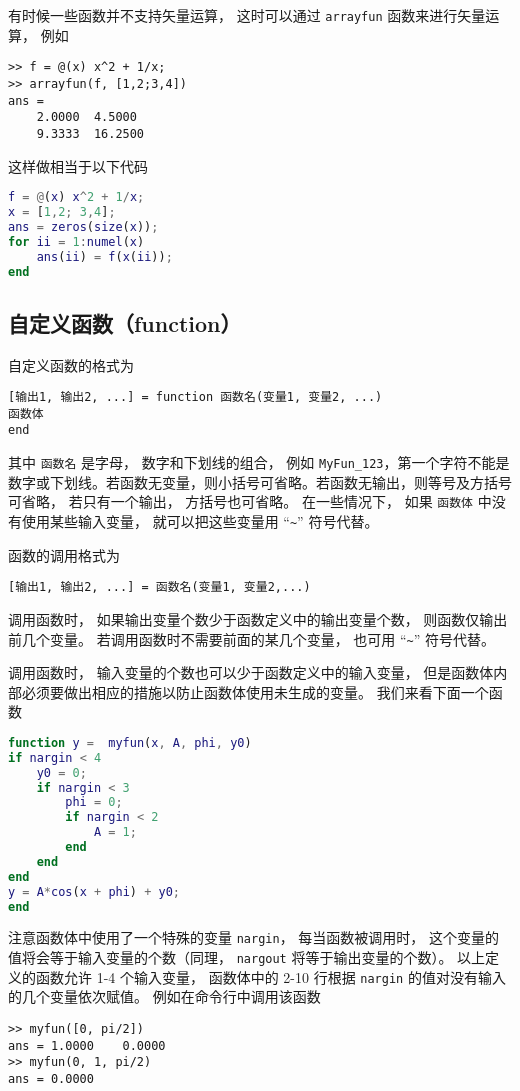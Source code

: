 有时候一些函数并不支持矢量运算， 这时可以通过 \verb|arrayfun| 函数来进行矢量运算， 例如
\begin{lstlisting}[language=matlabC]
>> f = @(x) x^2 + 1/x;
>> arrayfun(f, [1,2;3,4])
ans =
    2.0000  4.5000
    9.3333  16.2500
\end{lstlisting}
这样做相当于以下代码

\begin{lstlisting}[language=matlab]
f = @(x) x^2 + 1/x;
x = [1,2; 3,4];
ans = zeros(size(x));
for ii = 1:numel(x)
    ans(ii) = f(x(ii));
end
\end{lstlisting}

\subsection{自定义函数（function）}
自定义函数的格式为
\begin{lstlisting}[language=matlabC]
[输出1, 输出2, ...] = function 函数名(变量1, 变量2, ...)
函数体
end
\end{lstlisting}

其中 \verb|函数名| 是字母， 数字和下划线的组合， 例如 \verb|MyFun_123|，第一个字符不能是数字或下划线。若函数无变量，则小括号可省略。若函数无输出，则等号及方括号可省略， 若只有一个输出， 方括号也可省略。 在一些情况下， 如果 \verb|函数体| 中没有使用某些输入变量， 就可以把这些变量用 “\verb|~|” 符号代替。

函数的调用格式为
\begin{lstlisting}[language=matlabC]
[输出1, 输出2, ...] = 函数名(变量1, 变量2,...)
\end{lstlisting}
调用函数时， 如果输出变量个数少于函数定义中的输出变量个数， 则函数仅输出前几个变量。 若调用函数时不需要前面的某几个变量， 也可用 “\verb|~|” 符号代替。

调用函数时， 输入变量的个数也可以少于函数定义中的输入变量， 但是函数体内部必须要做出相应的措施以防止函数体使用未生成的变量。 我们来看下面一个函数

\begin{lstlisting}[language=matlab]
function y =  myfun(x, A, phi, y0)
if nargin < 4
    y0 = 0;
    if nargin < 3
        phi = 0;
        if nargin < 2
            A = 1;
        end
    end
end
y = A*cos(x + phi) + y0;
end
\end{lstlisting}

注意函数体中使用了一个特殊的变量 \verb|nargin|， 每当函数被调用时， 这个变量的值将会等于输入变量的个数（同理， \verb|nargout| 将等于输出变量的个数）。 以上定义的函数允许 1-4 个输入变量， 函数体中的 2-10 行根据 \verb|nargin| 的值对没有输入的几个变量依次赋值。 例如在命令行中调用该函数
\begin{lstlisting}[language=matlabC]
>> myfun([0, pi/2])
ans = 1.0000    0.0000
>> myfun(0, 1, pi/2)
ans = 0.0000
\end{lstlisting}

